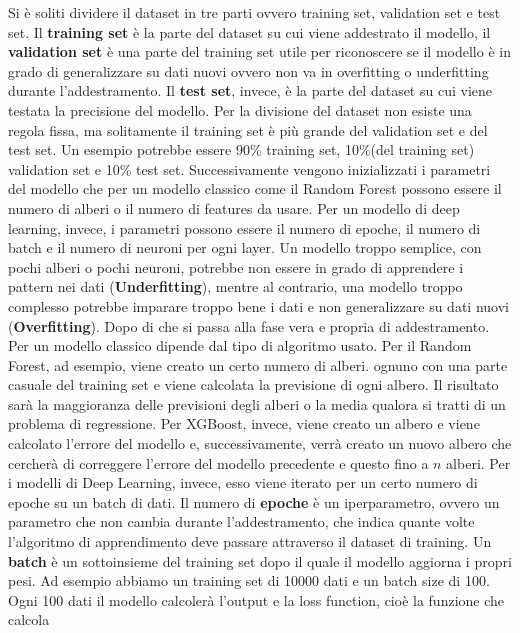 \documentclass[12pt,a4paper,openright,twoside]{book}
\begin{document}
\noindent Si è soliti dividere il dataset in tre parti ovvero training set, validation set e test set.
Il \textbf{training set} è la parte del dataset su cui viene addestrato
il modello, il \textbf{validation set} è una parte del training set
utile per riconoscere se il modello è in grado di generalizzare
su dati nuovi ovvero non va in overfitting o underfitting durante l'addestramento.
Il \textbf{test set}, invece, è la parte del dataset
su cui viene testata la precisione del modello.
Per la divisione del dataset non esiste una regola fissa,
ma solitamente il training set è più grande del validation set
e del test set. Un esempio potrebbe essere 90\% training set, 10\%(del training set) validation set
e 10\% test set.
Successivamente vengono inizializzati i parametri del modello
che per un modello classico come il Random Forest
possono essere il numero di alberi o il numero di features da usare.
Per un modello di deep learning, invece, i parametri possono essere
il numero di epoche, il numero di batch e il numero di neuroni per ogni layer.
Un modello troppo semplice, con pochi alberi o pochi neuroni,
potrebbe non essere in grado di apprendere i pattern
nei dati (\textbf{Underfitting}), mentre al contrario,
una modello troppo complesso potrebbe imparare
troppo bene i dati e non generalizzare su dati nuovi
(\textbf{Overfitting}).
Dopo di che si passa alla fase vera e propria di addestramento.
Per un modello classico dipende dal tipo di algoritmo usato.
Per il Random Forest, ad esempio, viene creato un certo numero di alberi. ognuno con una parte casuale del training set
e viene calcolata la previsione di ogni albero.
Il risultato sarà la maggioranza delle previsioni degli alberi o la media qualora si tratti di un problema di regressione.
Per XGBoost, invece, viene creato un albero e
viene calcolato l'errore del modello e, successivamente, verrà creato un nuovo albero
che cercherà di correggere l'errore del modello precedente e questo fino a $n$ alberi.
Per i modelli di Deep Learning, invece, esso viene iterato per un certo numero di epoche su un batch di dati.
Il numero di \textbf{epoche} è un iperparametro, ovvero un parametro che non cambia durante l'addestramento, che indica quante volte
l'algoritmo di apprendimento deve passare attraverso il dataset di training\cite{brownlee2018difference}.
Un \textbf{batch} è un sottoinsieme del training set dopo il quale il modello
aggiorna i propri pesi. Ad esempio abbiamo un training set di 10000 dati
e un batch size di 100. Ogni 100 dati il modello calcolerà
l'output e la loss function, cioè la funzione che calcola
\end{document}
